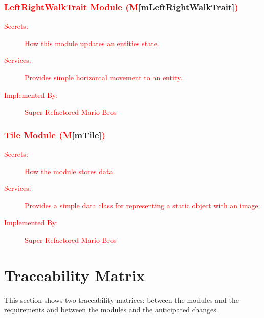 \documentclass[12pt, titlepage]{article}
\newcommand{\mref}[1]{M\ref{#1}}
\begin{document}
\subsubsection{\textcolor{red}{LeftRightWalkTrait Module (\mref{mLeftRightWalkTrait})}}

\begin{description}
\item[\textcolor{red}{Secrets:}] \textcolor{red}{How this module updates an entities state.}
\item[\textcolor{red}{Services:}] \textcolor{red}{Provides simple horizontal movement to an entity.}
\item[\textcolor{red}{Implemented By:}] \textcolor{red}{Super Refactored Mario Bros}
\end{description}

\subsubsection{\textcolor{red}{Tile Module (\mref{mTile})}}

\begin{description}
\item[\textcolor{red}{Secrets:}] \textcolor{red}{How the module stores data.}
\item[\textcolor{red}{Services:}] \textcolor{red}{Provides a simple data class for representing a static object with an image.}
\item[\textcolor{red}{Implemented By:}] \textcolor{red}{Super Refactored Mario Bros}
\end{description}

\section{Traceability Matrix} \label{SecTM}

This section shows two traceability matrices: between the modules and the
requirements and between the modules and the anticipated changes.
\end{document}

